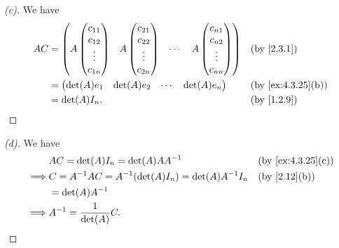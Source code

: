 \begin{proof}[(c)]
  We have
  \begin{align*}
    AC & = \begin{pmatrix}
             A \begin{pmatrix}
          c_{1 1} \\
          c_{1 2} \\
          \vdots  \\
          c_{1 n}
        \end{pmatrix} & A \begin{pmatrix}
                            c_{2 1} \\
                            c_{2 2} \\
                            \vdots  \\
                            c_{2 n}
                          \end{pmatrix} & \cdots & A \begin{pmatrix}
                                                       c_{n 1} \\
                                                       c_{n 2} \\
                                                       \vdots  \\
                                                       c_{n n}
                                                     \end{pmatrix}
           \end{pmatrix} &  & \by{2.3.1}                \\
       & = \begin{pmatrix}
             \det(A) e_1 & \det(A) e_2 & \cdots & \det(A) e_n
           \end{pmatrix}                                                   &  & \by{ex:4.3.25}[b]                            \\
       & = \det(A) I_n.                                                                                      &  & \by{1.2.9}
  \end{align*}
\end{proof}

\begin{proof}[(d)]
  We have
  \begin{align*}
             & AC = \det(A) I_n = \det(A) A A^{-1}                       &  & \by{ex:4.3.25}[c] \\
    \implies & C = A^{-1} AC = A^{-1} (\det(A) I_n) = \det(A) A^{-1} I_n &  & \by{2.12}[b]      \\
             & = \det(A) A^{-1}                                                                 \\
    \implies & A^{-1} = \dfrac{1}{\det(A)} C.
  \end{align*}
\end{proof}

